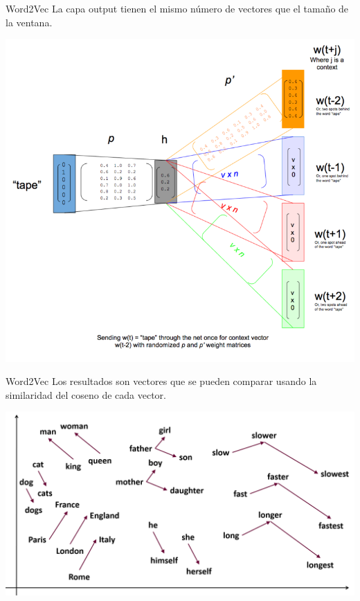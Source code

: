 \documentclass[table]{beamer}
\begin{document}
  \begin{frame}{Word2Vec}
      La capa output tienen el mismo número de vectores que el tamaño de la ventana.

      \centering
      \includegraphics[scale=0.50]{./figures/skip-gram-exp.png}
  \end{frame}

  \begin{frame}{Word2Vec}
      Los resultados son vectores que se pueden comparar usando la similaridad del coseno de cada vector.

      \centering
      \includegraphics[width=\textwidth]{./figures/res-w2v.png}
  \end{frame}
\end{document}
